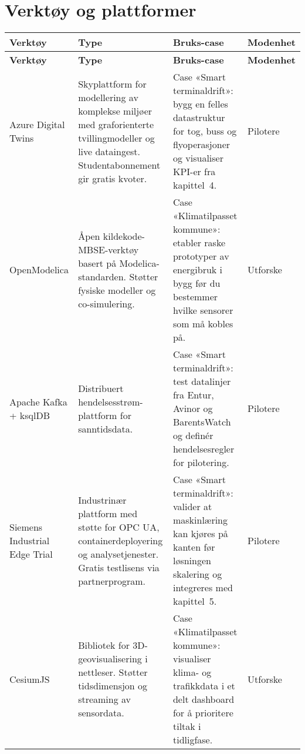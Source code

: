 \section{Verktøy og plattformer}
\begin{longtable}{p{}p{}p{}p{}}
\toprule
\textbf{Verktøy} & \textbf{Type} & \textbf{Bruks-case} & \textbf{Modenhet} \\
\midrule
\endfirsthead
\toprule
\textbf{Verktøy} & \textbf{Type} & \textbf{Bruks-case} & \textbf{Modenhet} \\
\midrule
\endhead
Azure Digital Twins & Skyplattform for modellering av komplekse miljøer med graforienterte tvillingmodeller og live dataingest. Studentabonnement gir gratis kvoter. & Case «Smart terminaldrift»: bygg en felles datastruktur for tog, buss og flyoperasjoner og visualiser KPI-er fra kapittel~4. & Pilotere \\
\addlinespace
OpenModelica & Åpen kildekode-MBSE-verktøy basert på Modelica-standarden. Støtter fysiske modeller og co-simulering. & Case «Klimatilpasset kommune»: etabler raske prototyper av energibruk i bygg før du bestemmer hvilke sensorer som må kobles på. & Utforske \\
\addlinespace
Apache Kafka + ksqlDB & Distribuert hendelsesstrøm-plattform for sanntidsdata. & Case «Smart terminaldrift»: test datalinjer fra Entur, Avinor og BarentsWatch og definér hendelsesregler for pilotering. & Pilotere \\
\addlinespace
Siemens Industrial Edge Trial & Industrinær plattform med støtte for OPC UA, containerdeployering og analysetjenester. Gratis testlisens via partnerprogram. & Case «Smart terminaldrift»: valider at maskinlæring kan kjøres på kanten før løsningen skalering og integreres med kapittel~5. & Pilotere \\
\addlinespace
CesiumJS & Bibliotek for 3D-geovisualisering i nettleser. Støtter tidsdimensjon og streaming av sensordata. & Case «Klimatilpasset kommune»: visualiser klima- og trafikkdata i et delt dashboard for å prioritere tiltak i tidligfase. & Utforske \\
\bottomrule
\end{longtable}

